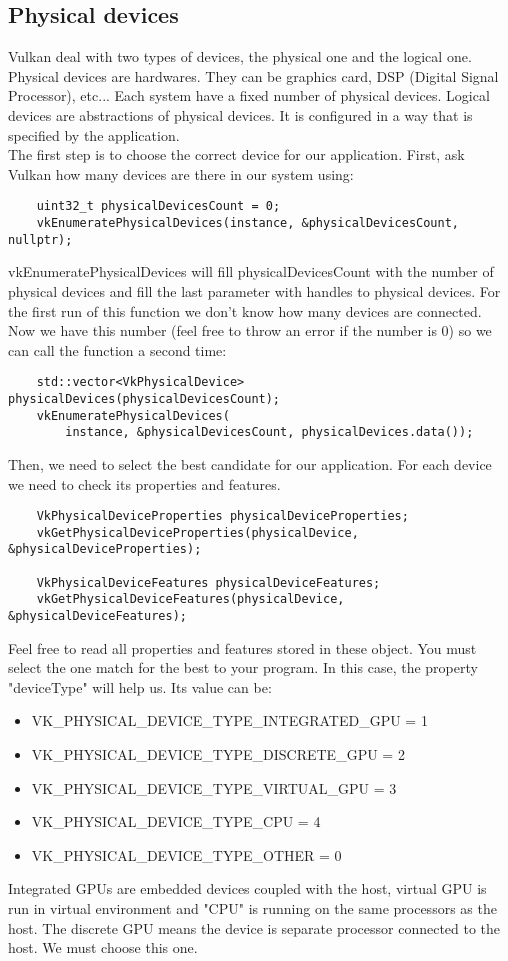 \documentclass{article}
\begin{document}
\subsection{Physical devices}
Vulkan deal with two types of devices, the physical one and the logical one. Physical devices are hardwares. They can be graphics card, DSP (Digital Signal Processor), etc... Each system have a fixed number of physical devices. Logical devices are abstractions of physical devices. It is configured in a way that is specified by the application.\\
The first step is to choose the correct device for our application. First, ask Vulkan how many devices are there in our system using:
\begin{lstlisting}
	uint32_t physicalDevicesCount = 0;
	vkEnumeratePhysicalDevices(instance, &physicalDevicesCount, nullptr);
\end{lstlisting}
vkEnumeratePhysicalDevices will fill physicalDevicesCount with the number of physical devices and fill the last parameter with handles to physical devices. For the first run of this function we don't know how many devices are connected. Now we have this number (feel free to throw an error if the number is 0) so we can call the function a second time:
\begin{lstlisting}
	std::vector<VkPhysicalDevice> physicalDevices(physicalDevicesCount);
	vkEnumeratePhysicalDevices(
		instance, &physicalDevicesCount, physicalDevices.data());
\end{lstlisting}
Then, we need to select the best candidate for our application. For each device we need to check its properties and features.
\begin{lstlisting}
	VkPhysicalDeviceProperties physicalDeviceProperties;
	vkGetPhysicalDeviceProperties(physicalDevice, &physicalDeviceProperties);

	VkPhysicalDeviceFeatures physicalDeviceFeatures;
	vkGetPhysicalDeviceFeatures(physicalDevice, &physicalDeviceFeatures);
\end{lstlisting}
Feel free to read all properties and features stored in these object. You must select the one match for the best to your program. In this case, the property "deviceType" will help us. Its value can be:
\begin{itemize}
	\item VK\_PHYSICAL\_DEVICE\_TYPE\_INTEGRATED\_GPU = 1
	\item VK\_PHYSICAL\_DEVICE\_TYPE\_DISCRETE\_GPU = 2
	\item VK\_PHYSICAL\_DEVICE\_TYPE\_VIRTUAL\_GPU = 3
	\item VK\_PHYSICAL\_DEVICE\_TYPE\_CPU = 4
	\item VK\_PHYSICAL\_DEVICE\_TYPE\_OTHER = 0
\end{itemize}
Integrated GPUs are embedded devices coupled with the host, virtual GPU is run in virtual environment and "CPU" is running on the same processors as the host. The discrete GPU means the device is separate processor connected to the host. We must choose this one.
\end{document}
